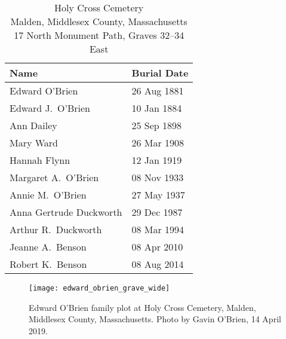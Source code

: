 \begin{table}[ht]
	\centering
	\caption{Holy Cross Cemetery\cite{HolyCrossPlot} \\
		Malden, Middlesex County, Massachusetts
		17 North Monument Path, Graves 32--34 East}
	\begin{tabular}{|l|l|}
		\hline
		\textbf{Name} & \textbf{Burial Date} \\
	\hline
	Edward O'Brien\index{O'Brien!Edward/Edmund\textsuperscript{2}} & 26 Aug 1881 \\
	\hline
	Edward J.\ O'Brien\index{O'Brien!Edward\textsuperscript{3} (1861--1884)} & 10 Jan 1884 \\
	\hline
	Ann Dailey\index{O'Brien!Ann\textsuperscript{2}}\index{Dailey!Ann\textsuperscript{2} (O'Brien)} & 25 Sep 1898 \\
	\hline
	Mary Ward\index{O'Brien!Mary\textsuperscript{2}}\index{Ward!Mary\textsuperscript{2} (O'Brien)} & 26 Mar 1908 \\
	\hline
	Hannah Flynn\index{Ward!Hannah/Hanora\textsuperscript{3}}\index{Flynn!Hannah/Hanora\textsuperscript{3} (Ward)} & 12 Jan 1919 \\
	\hline
	Margaret A.\ O'Brien\index{O'Brien!Margaret A.\textsuperscript{3} (1859--1933)} & 08 Nov 1933 \\
	\hline
	Annie M.\ O'Brien\index{O'Brien!Ann\textsuperscript{3}} & 27 May 1937 \\
	\hline
	Anna Gertrude Duckworth\index{Duckworth!Anna Gertrude} & 29 Dec 1987 \\
	\hline
	Arthur R.\ Duckworth\index{Duckworth!Arthur R.} & 08 Mar 1994 \\
	\hline
	Jeanne A.\ Benson\index{Benson!Jeanne A.} & 08 Apr 2010 \\
	\hline
	Robert K.\ Benson\index{Benson!Robert K.} & 08 Aug 2014 \\
	\hline
	\end{tabular}
\end{table}

\begin{figure}
	\centering
	\texttt{[image: edward\_obrien\_grave\_wide]}
	\caption{Edward O'Brien family plot at Holy Cross Cemetery, Malden, Middlesex County, Massachusetts. Photo by Gavin O'Brien, 14 April 2019.}
\end{figure}

